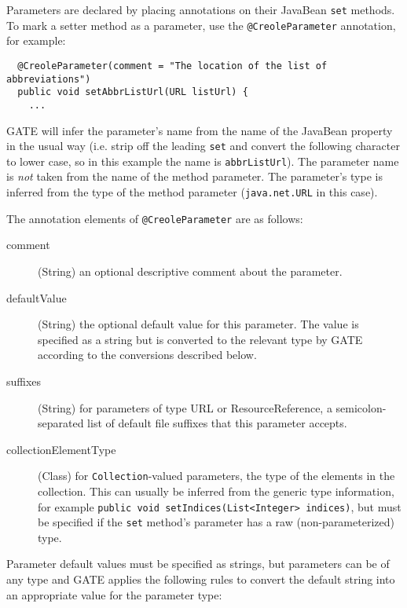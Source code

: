 Parameters are declared by placing annotations on their JavaBean {\tt set}
methods.  To mark a setter method as a parameter, use the
\verb|@CreoleParameter| annotation, for example:

\begin{small}\begin{verbatim}
  @CreoleParameter(comment = "The location of the list of abbreviations")
  public void setAbbrListUrl(URL listUrl) {
    ...
\end{verbatim}\end{small}

GATE will infer the parameter's name from the name of the JavaBean property in
the usual way (i.e. strip off the leading {\tt set} and convert the following
character to lower case, so in this example the name is {\tt abbrListUrl}).
The parameter name is \emph{not} taken from the name of the method parameter.
The parameter's type is inferred from the type of the method parameter
({\tt java.net.URL} in this case).

The annotation elements of \verb|@CreoleParameter| are as follows:
\begin{description}
\item[comment] (String) an optional descriptive comment about the parameter.
\item[defaultValue] (String) the optional default value for this parameter.
  The value is specified as a string but is converted to the relevant type by
  GATE according to the conversions described below.
\item[suffixes] (String) for parameters of type URL or ResourceReference, a
  semicolon-separated list of default file suffixes that this parameter accepts.
\item[collectionElementType] (Class) for {\tt Collection}-valued parameters,
  the type of the elements in the collection.  This can usually be inferred
  from the generic type information, for example
  \verb|public void setIndices(List<Integer> indices)|, but must be specified
  if the {\tt set} method's parameter has a raw (non-parameterized) type.
\end{description}

Parameter default values must be specified as strings, but parameters can be of
any type and GATE applies the following rules to convert the default string
into an appropriate value for the parameter type:

